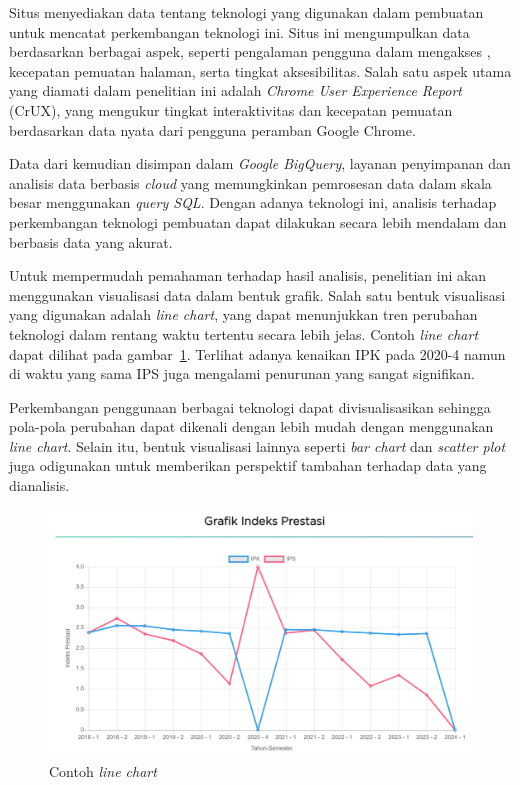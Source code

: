 Situs \http menyediakan data tentang teknologi yang digunakan dalam pembuatan \web untuk mencatat perkembangan teknologi ini. Situs ini mengumpulkan data berdasarkan berbagai aspek, seperti pengalaman pengguna dalam mengakses \web, kecepatan pemuatan halaman, serta tingkat aksesibilitas. Salah satu aspek utama yang diamati dalam penelitian ini adalah \textit{Chrome User Experience Report} (CrUX), yang mengukur tingkat interaktivitas dan kecepatan pemuatan \web berdasarkan data nyata dari pengguna peramban Google Chrome.

Data dari \http kemudian disimpan dalam \textit{Google BigQuery}, layanan penyimpanan dan analisis data berbasis \textit{cloud} yang memungkinkan pemrosesan data dalam skala besar menggunakan \textit{query SQL}. Dengan adanya teknologi ini, analisis terhadap perkembangan teknologi pembuatan \web dapat dilakukan secara lebih mendalam dan berbasis data yang akurat.

Untuk mempermudah pemahaman terhadap hasil analisis, penelitian ini akan menggunakan visualisasi data dalam bentuk grafik. Salah satu bentuk visualisasi yang digunakan adalah \textit{line chart}, yang dapat menunjukkan tren perubahan teknologi dalam rentang waktu tertentu secara lebih jelas. Contoh \textit{line chart} dapat dilihat pada gambar~\ref{fig:contohlinechart}. Terlihat adanya kenaikan IPK pada 2020-4 namun di waktu yang sama IPS juga mengalami penurunan yang sangat signifikan.

Perkembangan penggunaan berbagai teknologi \web dapat divisualisasikan sehingga pola-pola perubahan dapat dikenali dengan lebih mudah dengan menggunakan \textit{line chart}. Selain itu, bentuk visualisasi lainnya seperti \textit{bar chart} dan \textit{scatter plot} juga odigunakan untuk memberikan perspektif tambahan terhadap data yang dianalisis.

\begin{figure}[H]
        \centering
        \includegraphics[width=0.8\linewidth]{Gambar/ContohLineChart.png}
        \caption{Contoh \textit{line chart}}
        \label{fig:contohlinechart}
    \end{figure}

